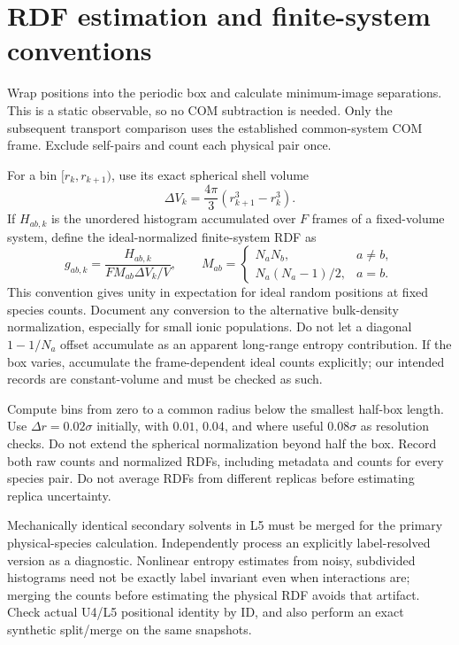 \documentclass[11pt,a4paper]{article}
\begin{document}
\section{RDF estimation and finite-system conventions}
Wrap positions into the periodic box and calculate minimum-image separations.
This is a static observable, so no COM subtraction is needed. Only the
subsequent transport comparison uses the established common-system COM frame.
Exclude self-pairs and count each physical pair once.

For a bin $[r_k,r_{k+1})$, use its exact spherical shell volume
\begin{equation}
\Delta V_k=\frac{4\pi}{3}(r_{k+1}^3-r_k^3).
\end{equation}
If $H_{ab,k}$ is the unordered histogram accumulated over $F$ frames of a
fixed-volume system, define the ideal-normalized finite-system RDF as
\begin{equation}
g_{ab,k}=\frac{H_{ab,k}}{F M_{ab}\Delta V_k/V},\qquad
M_{ab}=\begin{cases}N_aN_b,&a\ne b,\\
N_a(N_a-1)/2,&a=b.\end{cases}
\end{equation}
This convention gives unity in expectation for ideal random positions at
fixed species counts. Document any conversion to the alternative bulk-density
normalization, especially for small ionic populations. Do not let a diagonal
$1-1/N_a$ offset accumulate as an apparent long-range entropy contribution.
If the box varies, accumulate the frame-dependent ideal counts explicitly;
our intended records are constant-volume and must be checked as such.

Compute bins from zero to a common radius below the smallest half-box length.
Use $\Delta r=0.02\sigma$ initially, with $0.01$, $0.04$, and where useful
$0.08\sigma$ as resolution checks. Do not extend the spherical normalization
beyond half the box. Record both raw counts and normalized RDFs, including
metadata and counts for every species pair. Do not average RDFs from different
replicas before estimating replica uncertainty.

Mechanically identical secondary solvents in L5 must be merged for the primary
physical-species calculation. Independently process an explicitly label-resolved
version as a diagnostic. Nonlinear entropy estimates from noisy, subdivided
histograms need not be exactly label invariant even when interactions are;
merging the counts before estimating the physical RDF avoids that artifact.
Check actual U4/L5 positional identity by ID, and also perform an exact
synthetic split/merge on the same snapshots.
\end{document}
